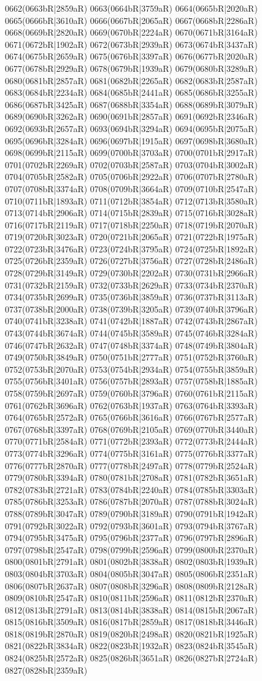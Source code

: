 0662(0663bR|2859aR) 0663(0664bR|3759aR) 0664(0665bR|2020aR) 0665(0666bR|3610aR) 0666(0667bR|2065aR) 0667(0668bR|2286aR) 0668(0669bR|2820aR) 0669(0670bR|2224aR) 0670(0671bR|3164aR) 0671(0672bR|1902aR) 0672(0673bR|2939aR) 0673(0674bR|3437aR) 0674(0675bR|2659aR) 0675(0676bR|3397aR) 0676(0677bR|2020aR) 0677(0678bR|2929aR) 0678(0679bR|1939aR) 0679(0680bR|3289aR) 0680(0681bR|2857aR) 0681(0682bR|2265aR) 0682(0683bR|2587aR) 0683(0684bR|2234aR) 0684(0685bR|2441aR) 0685(0686bR|3255aR) 0686(0687bR|3425aR) 0687(0688bR|3354aR) 0688(0689bR|3079aR) 0689(0690bR|3262aR) 0690(0691bR|2857aR) 0691(0692bR|2346aR) 0692(0693bR|2657aR) 0693(0694bR|3294aR) 0694(0695bR|2075aR) 0695(0696bR|3284aR) 0696(0697bR|1915aR) 0697(0698bR|3680aR) 0698(0699bR|2115aR) 0699(0700bR|3703aR) 0700(0701bR|2917aR) 0701(0702bR|2269aR) 0702(0703bR|2587aR) 0703(0704bR|3002aR) 0704(0705bR|2582aR) 0705(0706bR|2922aR) 0706(0707bR|2780aR) 0707(0708bR|3374aR) 0708(0709bR|3664aR) 0709(0710bR|2547aR) 0710(0711bR|1893aR) 0711(0712bR|3854aR) 0712(0713bR|3580aR) 0713(0714bR|2906aR) 0714(0715bR|2839aR) 0715(0716bR|3028aR) 0716(0717bR|2119aR) 0717(0718bR|2250aR) 0718(0719bR|2070aR) 0719(0720bR|3023aR) 0720(0721bR|2065aR) 0721(0722bR|1975aR) 0722(0723bR|3476aR) 0723(0724bR|3795aR) 0724(0725bR|1892aR) 0725(0726bR|2359aR) 0726(0727bR|3756aR) 0727(0728bR|2486aR) 0728(0729bR|3149aR) 0729(0730bR|2202aR) 0730(0731bR|2966aR) 0731(0732bR|2159aR) 0732(0733bR|2629aR) 0733(0734bR|2370aR) 0734(0735bR|2699aR) 0735(0736bR|3859aR) 0736(0737bR|3113aR) 0737(0738bR|2000aR) 0738(0739bR|3205aR) 0739(0740bR|3796aR) 0740(0741bR|3238aR) 0741(0742bR|1887aR) 0742(0743bR|2867aR) 0743(0744bR|3674aR) 0744(0745bR|3589aR) 0745(0746bR|3284aR) 0746(0747bR|2632aR) 0747(0748bR|3374aR) 0748(0749bR|3804aR) 0749(0750bR|3849aR) 0750(0751bR|2777aR) 0751(0752bR|3760aR) 0752(0753bR|2070aR) 0753(0754bR|2934aR) 0754(0755bR|3859aR) 0755(0756bR|3401aR) 0756(0757bR|2893aR) 0757(0758bR|1885aR) 0758(0759bR|2697aR) 0759(0760bR|3796aR) 0760(0761bR|2115aR) 0761(0762bR|3696aR) 0762(0763bR|1937aR) 0763(0764bR|3393aR) 0764(0765bR|2572aR) 0765(0766bR|3616aR) 0766(0767bR|2577aR) 0767(0768bR|3397aR) 0768(0769bR|2105aR) 0769(0770bR|3440aR) 0770(0771bR|2584aR) 0771(0772bR|2393aR) 0772(0773bR|2444aR) 0773(0774bR|3296aR) 0774(0775bR|3161aR) 0775(0776bR|3377aR) 0776(0777bR|2870aR) 0777(0778bR|2497aR) 0778(0779bR|2524aR) 0779(0780bR|3394aR) 0780(0781bR|2708aR) 0781(0782bR|3651aR) 0782(0783bR|2721aR) 0783(0784bR|2240aR) 0784(0785bR|3303aR) 0785(0786bR|3253aR) 0786(0787bR|2070aR) 0787(0788bR|3024aR) 0788(0789bR|3047aR) 0789(0790bR|3189aR) 0790(0791bR|1942aR) 0791(0792bR|3022aR) 0792(0793bR|3601aR) 0793(0794bR|3767aR) 0794(0795bR|3475aR) 0795(0796bR|2377aR) 0796(0797bR|2896aR) 0797(0798bR|2547aR) 0798(0799bR|2596aR) 0799(0800bR|2370aR) 0800(0801bR|2791aR) 0801(0802bR|3838aR) 0802(0803bR|1939aR) 0803(0804bR|3703aR) 0804(0805bR|3047aR) 0805(0806bR|2351aR) 0806(0807bR|2637aR) 0807(0808bR|3296aR) 0808(0809bR|2128aR) 0809(0810bR|2547aR) 0810(0811bR|2596aR) 0811(0812bR|2370aR) 0812(0813bR|2791aR) 0813(0814bR|3838aR) 0814(0815bR|2067aR) 0815(0816bR|3509aR) 0816(0817bR|2859aR) 0817(0818bR|3446aR) 0818(0819bR|2870aR) 0819(0820bR|2498aR) 0820(0821bR|1925aR) 0821(0822bR|3834aR) 0822(0823bR|1932aR) 0823(0824bR|3545aR) 0824(0825bR|2572aR) 0825(0826bR|3651aR) 0826(0827bR|2724aR) 0827(0828bR|2359aR) 